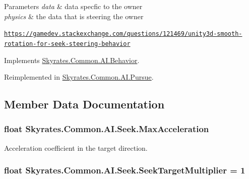 \begin{DoxyParams}{Parameters}
{\em data} & data specfic to the owner\\
\hline
{\em physics} & the data that is steering the owner\\
\hline
\end{DoxyParams}
 \href{https://gamedev.stackexchange.com/questions/121469/unity3d-smooth-rotation-for-seek-steering-behavior}{\tt https\-://gamedev.\-stackexchange.\-com/questions/121469/unity3d-\/smooth-\/rotation-\/for-\/seek-\/steering-\/behavior} 

Implements \hyperlink{class_skyrates_1_1_common_1_1_a_i_1_1_behavior_ae905e75f0456dececef5a5bccea7bcf7}{Skyrates.\-Common.\-A\-I.\-Behavior}.



Reimplemented in \hyperlink{class_skyrates_1_1_common_1_1_a_i_1_1_pursue_ab504e85e4e66a580205dd71c74df030d}{Skyrates.\-Common.\-A\-I.\-Pursue}.



\subsection{Member Data Documentation}
\hypertarget{class_skyrates_1_1_common_1_1_a_i_1_1_seek_a08a5c4d978290a44ef258d6f68ffbe6c}{
\subsubsection[{Max\-Acceleration}]{\setlength{\rightskip}{0pt plus 5cm}float Skyrates.\-Common.\-A\-I.\-Seek.\-Max\-Acceleration}}\label{class_skyrates_1_1_common_1_1_a_i_1_1_seek_a08a5c4d978290a44ef258d6f68ffbe6c}


Acceleration coefficient in the target direction. 

\hypertarget{class_skyrates_1_1_common_1_1_a_i_1_1_seek_a983175b5865affa4083800267adf4ae5}{
\subsubsection[{Seek\-Target\-Multiplier}]{\setlength{\rightskip}{0pt plus 5cm}float Skyrates.\-Common.\-A\-I.\-Seek.\-Seek\-Target\-Multiplier = 1}}\label{class_skyrates_1_1_common_1_1_a_i_1_1_seek_a983175b5865affa4083800267adf4ae5}


